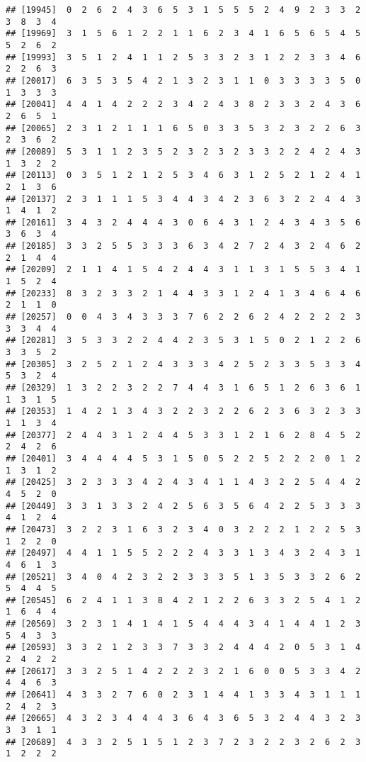 \documentclass[
]{article}
\begin{document}
\begin{verbatim}
## [19945]  0  2  6  2  4  3  6  5  3  1  5  5  5  2  4  9  2  3  3  2  3  8  3  4
## [19969]  3  1  5  6  1  2  2  1  1  6  2  3  4  1  6  5  6  5  4  5  5  2  6  2
## [19993]  3  5  1  2  4  1  1  2  5  3  3  2  3  1  2  2  3  3  4  6  2  2  6  3
## [20017]  6  3  5  3  5  4  2  1  3  2  3  1  1  0  3  3  3  3  5  0  1  3  3  3
## [20041]  4  4  1  4  2  2  2  3  4  2  4  3  8  2  3  3  2  4  3  6  2  6  5  1
## [20065]  2  3  1  2  1  1  1  6  5  0  3  3  5  3  2  3  2  2  6  3  2  3  6  2
## [20089]  5  3  1  1  2  3  5  2  3  2  3  2  3  3  2  2  4  2  4  3  1  3  2  2
## [20113]  0  3  5  1  2  1  2  5  3  4  6  3  1  2  5  2  1  2  4  1  2  1  3  6
## [20137]  2  3  1  1  1  5  3  4  4  3  4  2  3  6  3  2  2  4  4  3  1  4  1  2
## [20161]  3  4  3  2  4  4  4  3  0  6  4  3  1  2  4  3  4  3  5  6  3  6  3  4
## [20185]  3  3  2  5  5  3  3  3  6  3  4  2  7  2  4  3  2  4  6  2  2  1  4  4
## [20209]  2  1  1  4  1  5  4  2  4  4  3  1  1  3  1  5  5  3  4  1  1  5  2  4
## [20233]  8  3  2  3  3  2  1  4  4  3  3  1  2  4  1  3  4  6  4  6  2  1  1  0
## [20257]  0  0  4  3  4  3  3  3  7  6  2  2  6  2  4  2  2  2  2  3  3  3  4  4
## [20281]  3  5  3  3  2  2  4  4  2  3  5  3  1  5  0  2  1  2  2  6  3  3  5  2
## [20305]  3  2  5  2  1  2  4  3  3  3  4  2  5  2  3  3  5  3  3  4  5  3  2  4
## [20329]  1  3  2  2  3  2  2  7  4  4  3  1  6  5  1  2  6  3  6  1  1  3  1  5
## [20353]  1  4  2  1  3  4  3  2  2  3  2  2  6  2  3  6  3  2  3  3  1  1  3  4
## [20377]  2  4  4  3  1  2  4  4  5  3  3  1  2  1  6  2  8  4  5  2  2  4  2  6
## [20401]  3  4  4  4  4  5  3  1  5  0  5  2  2  5  2  2  2  0  1  2  1  3  1  2
## [20425]  3  2  3  3  3  4  2  4  3  4  1  1  4  3  2  2  5  4  4  2  4  5  2  0
## [20449]  3  3  1  3  3  2  4  2  5  6  3  5  6  4  2  2  5  3  3  3  4  1  2  4
## [20473]  3  2  2  3  1  6  3  2  3  4  0  3  2  2  2  1  2  2  5  3  1  2  2  0
## [20497]  4  4  1  1  5  5  2  2  2  4  3  3  1  3  4  3  2  4  3  1  4  6  1  3
## [20521]  3  4  0  4  2  3  2  2  3  3  3  5  1  3  5  3  3  2  6  2  5  4  4  5
## [20545]  6  2  4  1  1  3  8  4  2  1  2  2  6  3  3  2  5  4  1  2  1  6  4  4
## [20569]  3  2  3  1  4  1  4  1  5  4  4  4  3  4  1  4  4  1  2  3  5  4  3  3
## [20593]  3  3  2  1  2  3  3  7  3  3  2  4  4  4  2  0  5  3  1  4  2  4  2  2
## [20617]  3  3  2  5  1  4  2  2  2  3  2  1  6  0  0  5  3  3  4  2  4  4  6  3
## [20641]  4  3  3  2  7  6  0  2  3  1  4  4  1  3  3  4  3  1  1  1  2  4  2  3
## [20665]  4  3  2  3  4  4  4  3  6  4  3  6  5  3  2  4  4  3  2  3  3  3  1  1
## [20689]  4  3  3  2  5  1  5  1  2  3  7  2  3  2  2  3  2  6  2  3  1  2  2  2

\end{verbatim}
\end{document}
